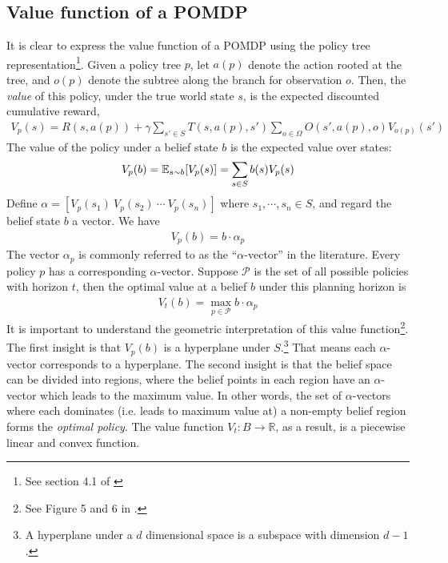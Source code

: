 \documentclass{article}
\begin{document}
\subsection{Value function of a POMDP}
It is clear to express the value function of a POMDP using the
policy tree representation\footnote{See section 4.1 of \citet{kaelbling1998planning}}.
Given a policy tree $p$, let $a(p)$ denote the action rooted at the tree, and
$o(p)$ denote the subtree along the branch for observation $o$. Then, the \emph{value}
of this policy, under the true world state $s$, is the expected discounted cumulative reward,
\begin{align}
V_p(s) = R(s,a(p)) + \gamma \sum_{s'\in S}T(s,a(p),s')\sum_{o\in\Omega}O(s',a(p),o) V_{o(p)}(s')
\end{align}
The value of the policy under a belief state $b$ is the expected value over states:
\begin{align}
V_p(b) = \mathbb{E}_{s\sim b} [V_p(s)] = \sum_{s\in S}b(s)V_p(s)
\end{align}
Define $\alpha=[ V_p(s_1)\ V_p(s_2)\ \cdots\ V_p(s_n)]$ where $s_1,\cdots,s_n\in S$, and regard the belief state $b$ a vector. We have
\begin{align}
V_p(b) = b\cdot \alpha_p
\end{align}
The vector $\alpha_p$ is commonly referred to as the ``$\alpha$-vector'' in the literature. Every policy $p$ has a corresponding $\alpha$-vector. Suppose $\mathcal{P}$ is the set of all possible policies with horizon $t$, then the optimal value at a belief $b$ under this planning horizon is
\begin{align}
V_t(b) = \max_{p\in\mathcal{P}} b\cdot \alpha_p
\end{align}
It is important to understand the geometric interpretation of this value function\footnote{See Figure 5 and 6 in \citet{kaelbling1998planning}.}. The first insight is that $V_p(b)$ is a hyperplane under $S$.\footnote{A hyperplane under a $d$ dimensional space is a subspace with dimension $d-1$.} That means each $\alpha$-vector corresponds to a hyperplane. The second insight is that the belief space can be divided into regions, where the belief points in each region have an $\alpha$-vector which leads to the maximum value. In other words, the set of $\alpha$-vectors where each dominates (i.e. leads to maximum value at) a non-empty belief region forms the \emph{optimal policy}. The value function $V_t:B\rightarrow \mathbb{R}$, as a result, is a piecewise linear and convex function.
\end{document}
